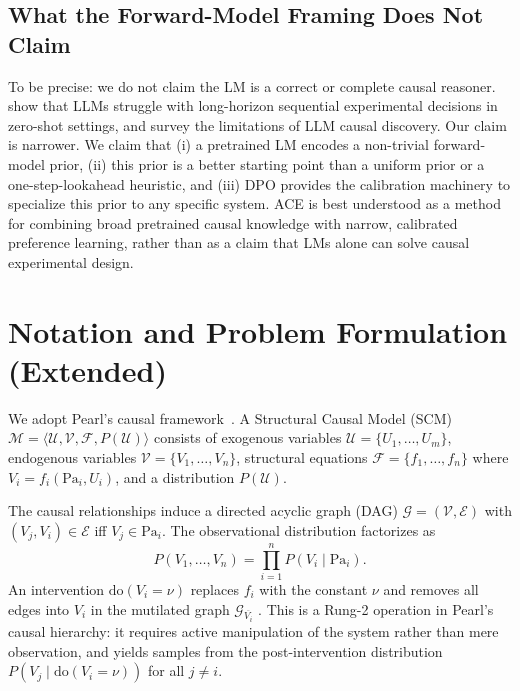 \documentclass[twoside]{article}
\theoremstyle{plain}
\theoremstyle{definition}
\theoremstyle{remark}
\begin{document}
\subsection{What the Forward-Model Framing Does Not Claim}

To be precise: we do not claim the LM is a correct or complete causal reasoner. \citet{boxinggym2025,autobench2025} show that LLMs struggle with long-horizon sequential experimental decisions in zero-shot settings, and \citet{llm_science_survey2025} survey the limitations of LLM causal discovery. Our claim is narrower. We claim that (i) a pretrained LM encodes a non-trivial forward-model prior, (ii) this prior is a better starting point than a uniform prior or a one-step-lookahead heuristic, and (iii) DPO provides the calibration machinery to specialize this prior to any specific system. ACE is best understood as a method for combining broad pretrained causal knowledge with narrow, calibrated preference learning, rather than as a claim that LMs alone can solve causal experimental design.

\section{Notation and Problem Formulation (Extended)}
\label{app:notation}

We adopt Pearl's causal framework~\citep{pearl2009causality,pearl1995causal}. A Structural Causal Model (SCM) $\mathcal{M} = \langle \mathcal{U}, \mathcal{V}, \mathcal{F}, P(\mathcal{U}) \rangle$ consists of exogenous variables $\mathcal{U} = \{U_1, \ldots, U_m\}$, endogenous variables $\mathcal{V} = \{V_1, \ldots, V_n\}$, structural equations $\mathcal{F} = \{f_1, \ldots, f_n\}$ where $V_i = f_i(\text{Pa}_i, U_i)$, and a distribution $P(\mathcal{U})$.

The causal relationships induce a directed acyclic graph (DAG) $\mathcal{G} = (\mathcal{V}, \mathcal{E})$ with $(V_j, V_i) \in \mathcal{E}$ iff $V_j \in \text{Pa}_i$. The observational distribution factorizes as
\begin{equation}
P(V_1, \ldots, V_n) = \prod_{i=1}^n P(V_i \mid \text{Pa}_i).
\end{equation}
An intervention $\text{do}(V_i = \nu)$ replaces $f_i$ with the constant $\nu$ and removes all edges into $V_i$ in the mutilated graph $\mathcal{G}_{\overline{V_i}}$ \citep{pearl2009causality}. This is a Rung-2 operation in Pearl's causal hierarchy: it requires active manipulation of the system rather than mere observation, and yields samples from the post-intervention distribution $P(V_j \mid \text{do}(V_i = \nu))$ for all $j \ne i$.
\end{document}
